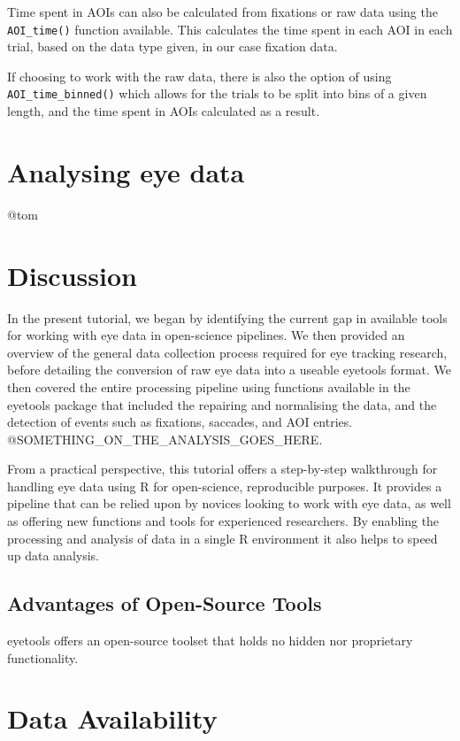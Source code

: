 \documentclass[
  man,
  floatsintext,
  longtable,
  nolmodern,
  notxfonts,
  notimes,
  colorlinks=true,linkcolor=blue,citecolor=blue,urlcolor=blue]{apa7}
\begin{document}
Time spent in AOIs can also be calculated from fixations or raw data
using the \texttt{AOI\_time()} function available. This calculates the
time spent in each AOI in each trial, based on the data type given, in
our case fixation data.

If choosing to work with the raw data, there is also the option of using
\texttt{AOI\_time\_binned()} which allows for the trials to be split
into bins of a given length, and the time spent in AOIs calculated as a
result.

\section{Analysing eye data}\label{analysing-eye-data}

@tom

\section{Discussion}\label{discussion}

In the present tutorial, we began by identifying the current gap in
available tools for working with eye data in open-science pipelines. We
then provided an overview of the general data collection process
required for eye tracking research, before detailing the conversion of
raw eye data into a useable eyetools format. We then covered the entire
processing pipeline using functions available in the eyetools package
that included the repairing and normalising the data, and the detection
of events such as fixations, saccades, and AOI entries.
@SOMETHING\_ON\_THE\_ANALYSIS\_GOES\_HERE.

From a practical perspective, this tutorial offers a step-by-step
walkthrough for handling eye data using R for open-science, reproducible
purposes. It provides a pipeline that can be relied upon by novices
looking to work with eye data, as well as offering new functions and
tools for experienced researchers. By enabling the processing and
analysis of data in a single R environment it also helps to speed up
data analysis.

\subsection{Advantages of Open-Source
Tools}\label{advantages-of-open-source-tools}

eyetools offers an open-source toolset that holds no hidden nor
proprietary functionality.

\section{Data Availability}\label{data-availability}
\end{document}
